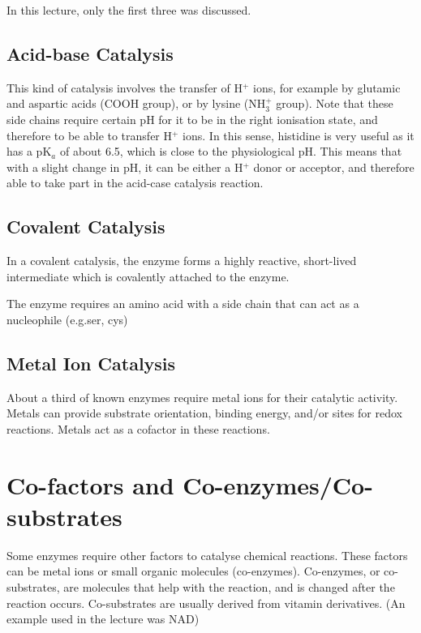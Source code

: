 \documentclass[a4paper, 12pt]{report}
\begin{document}
In this lecture, only the first three was discussed.

\subsection{Acid-base Catalysis}

This kind of catalysis involves the transfer of H$^+$ ions, for example by glutamic and aspartic acids (COOH group), or by lysine (NH$_3^+$ group).
Note that these side chains require certain pH for it to be in the right ionisation state, and therefore to be able to transfer H$^+$ ions.
In this sense, histidine is very useful as it has a pK$_a$ of about 6.5, which is close to the physiological pH.
This means that with a slight change in pH, it can be either a H$^+$ donor or acceptor, and therefore able to take part in the acid-case catalysis reaction.

\subsection{Covalent Catalysis}

In a covalent catalysis, the enzyme forms a highly reactive, short-lived intermediate which is covalently attached to the enzyme.

\begin{center}
\end{center}

The enzyme requires an amino acid with a side chain that can act as a nucleophile (e.g.ser, cys)

\subsection{Metal Ion Catalysis}

About a third of known enzymes require metal ions for their catalytic activity.
Metals can provide substrate orientation, binding energy, and/or sites for redox reactions.
Metals act as a cofactor in these reactions.

\section{Co-factors and Co-enzymes/Co-substrates}

Some enzymes require other factors to catalyse chemical reactions.
These factors can be metal ions or small organic molecules (co-enzymes).
Co-enzymes, or co-substrates, are molecules that help with the reaction, and is changed after the reaction occurs.
Co-substrates are usually derived from vitamin derivatives.
(An example used in the lecture was NAD)
\end{document}
